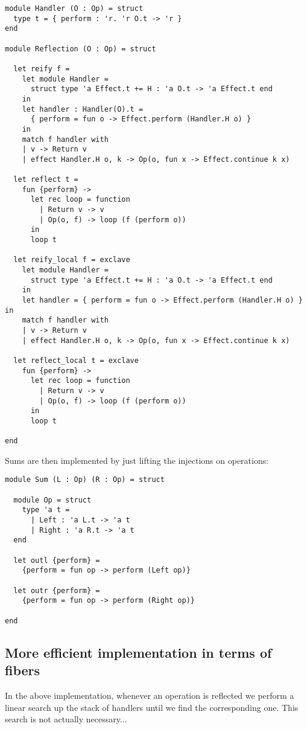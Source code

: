 \documentclass[acmsmall, screen, nonacm]{acmart}
\theoremstyle{definition}
\begin{document}
\begin{lstlisting}[style=oxcaml]
module Handler (O : Op) = struct
  type t = { perform : 'r. 'r O.t -> 'r }
end

module Reflection (O : Op) = struct

  let reify f =
    let module Handler =
      struct type 'a Effect.t += H : 'a O.t -> 'a Effect.t end
    in
    let handler : Handler(O).t =
      { perform = fun o -> Effect.perform (Handler.H o) }
    in
    match f handler with
    | v -> Return v
    | effect Handler.H o, k -> Op(o, fun x -> Effect.continue k x)

  let reflect t =
    fun {perform} ->
      let rec loop = function
        | Return v -> v
        | Op(o, f) -> loop (f (perform o))
      in
      loop t

  let reify_local f = exclave
    let module Handler =
      struct type 'a Effect.t += H : 'a O.t -> 'a Effect.t end
    in
    let handler = { perform = fun o -> Effect.perform (Handler.H o) } in
    match f handler with
    | v -> Return v
    | effect Handler.H o, k -> Op(o, fun x -> Effect.continue k x)

  let reflect_local t = exclave
    fun {perform} ->
      let rec loop = function
        | Return v -> v
        | Op(o, f) -> loop (f (perform o))
      in
      loop t

end
\end{lstlisting}
Sums are then implemented by just lifting the injections on operations:
\begin{lstlisting}[style=oxcaml]
module Sum (L : Op) (R : Op) = struct

  module Op = struct
    type 'a t =
      | Left : 'a L.t -> 'a t
      | Right : 'a R.t -> 'a t
  end    

  let outl {perform} =
    {perform = fun op -> perform (Left op)}

  let outr {perform} =
    {perform = fun op -> perform (Right op)}

end
\end{lstlisting}

\subsection{More efficient implementation in terms of fibers}

In the above implementation, whenever an operation is reflected we
perform a linear search up the stack of handlers until we find the
corresponding one. This search is not actually necessary...
\end{document}

